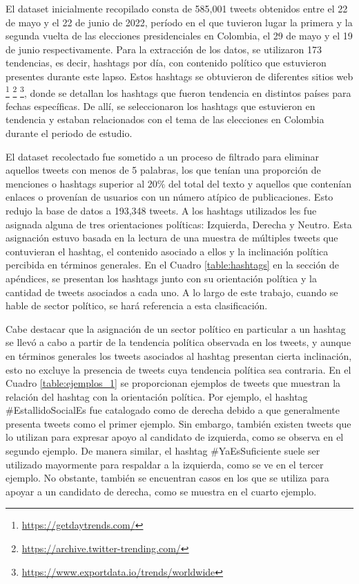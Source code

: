 El dataset inicialmente recopilado consta de 585,001 tweets obtenidos entre el 22 de mayo y el 22 de junio de 2022, período en el que tuvieron lugar la primera y la segunda vuelta de las elecciones presidenciales en Colombia, el 29 de mayo y el 19 de junio respectivamente. Para la extracción de los datos, se utilizaron 173 tendencias, es decir, hashtags por día, con contenido político que estuvieron presentes durante este lapso. Estos hashtags se obtuvieron de diferentes sitios web \footnote{\url{https://getdaytrends.com/}} \footnote{\url{https://archive.twitter-trending.com/}} \footnote{\url{https://www.exportdata.io/trends/worldwide}}, donde se detallan los hashtags que fueron tendencia en distintos países para fechas específicas. De allí, se seleccionaron los hashtags que estuvieron en tendencia y estaban relacionados con el tema de las elecciones en Colombia durante el periodo de estudio.

El dataset recolectado fue sometido a un proceso de filtrado para eliminar aquellos tweets con menos de 5 palabras, los que tenían una proporción de menciones o hashtags superior al 20\% del total del texto y aquellos que contenían enlaces o provenían de usuarios con un número atípico de publicaciones. Esto redujo la base de datos a 193,348 tweets. A los hashtags utilizados les fue asignada alguna de tres orientaciones políticas: Izquierda, Derecha y Neutro. Esta asignación estuvo basada en la lectura de una muestra de múltiples tweets que contuvieran el hashtag, el contenido asociado a ellos y la inclinación política percibida en términos generales. En el Cuadro \ref{table:hashtags} en la sección de apéndices, se presentan los hashtags junto con su orientación política y la cantidad de tweets asociados a cada uno. A lo largo de este trabajo, cuando se hable de sector político, se hará referencia a esta clasificación.

Cabe destacar que la asignación de un sector político en particular a un hashtag se llevó a cabo a partir de la tendencia política observada en los tweets, y aunque en términos generales los tweets asociados al hashtag presentan cierta inclinación, esto no excluye la presencia de tweets cuya tendencia política sea contraria. En el Cuadro \ref{table:ejemplos_1} se proporcionan ejemplos de tweets que muestran la relación del hashtag con la orientación política. Por ejemplo, el hashtag \#EstallidoSocialEs fue catalogado como de derecha debido a que generalmente presenta tweets como el primer ejemplo. Sin embargo, también existen tweets que lo utilizan para expresar apoyo al candidato de izquierda, como se observa en el segundo ejemplo. De manera similar, el hashtag \#YaEsSuficiente suele ser utilizado mayormente para respaldar a la izquierda, como se ve en el tercer ejemplo. No obstante, también se encuentran casos en los que se utiliza para apoyar a un candidato de derecha, como se muestra en el cuarto ejemplo.


